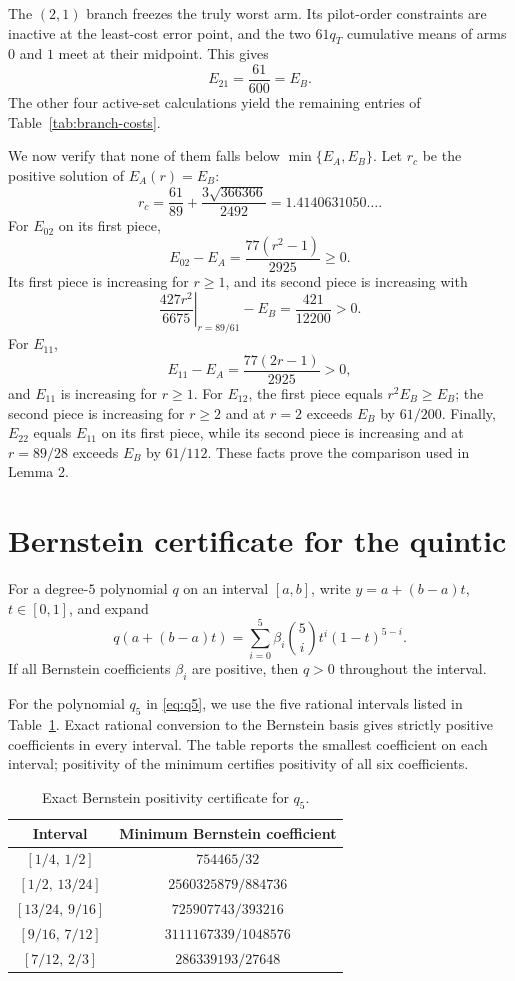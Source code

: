 \documentclass[11pt]{article}
\theoremstyle{definition}
\theoremstyle{remark}
\begin{document}
The $(2,1)$ branch freezes the truly worst arm. Its pilot-order constraints are inactive at the least-cost error point, and the two $61q_T$ cumulative means of arms $0$ and $1$ meet at their midpoint. This gives
\[
E_{21}=\frac{61}{600}=E_B.
\]
The other four active-set calculations yield the remaining entries of Table~\ref{tab:branch-costs}.

We now verify that none of them falls below $\min\{E_A,E_B\}$. Let $r_c$ be the positive solution of $E_A(r)=E_B$:
\[
r_c=\frac{61}{89}+\frac{3\sqrt{366366}}{2492}
=1.4140631050\ldots.
\]
For $E_{02}$ on its first piece,
\[
E_{02}-E_A=\frac{77(r^2-1)}{2925}\ge0.
\]
Its first piece is increasing for $r\ge1$, and its second piece is increasing with
\[
\left.\frac{427r^2}{6675}\right|_{r=89/61}-E_B=\frac{421}{12200}>0.
\]
For $E_{11}$,
\[
E_{11}-E_A=\frac{77(2r-1)}{2925}>0,
\]
and $E_{11}$ is increasing for $r\ge1$. For $E_{12}$, the first piece equals $r^2E_B\ge E_B$; the second piece is increasing for $r\ge2$ and at $r=2$ exceeds $E_B$ by $61/200$. Finally, $E_{22}$ equals $E_{11}$ on its first piece, while its second piece is increasing and at $r=89/28$ exceeds $E_B$ by $61/112$. These facts prove the comparison used in Lemma 2.

\section{Bernstein certificate for the quintic}
\label{app:bernstein}

For a degree-$5$ polynomial $q$ on an interval $[a,b]$, write $y=a+(b-a)t$, $t\in[0,1]$, and expand
\[
q(a+(b-a)t)=\sum_{i=0}^5 \beta_i\binom{5}{i}t^i(1-t)^{5-i}.
\]
If all Bernstein coefficients $\beta_i$ are positive, then $q>0$ throughout the interval.

For the polynomial $q_5$ in \eqref{eq:q5}, we use the five rational intervals listed in Table~\ref{tab:bernstein}. Exact rational conversion to the Bernstein basis gives strictly positive coefficients in every interval. The table reports the smallest coefficient on each interval; positivity of the minimum certifies positivity of all six coefficients.

\begin{table}[ht]
\centering
\small
\caption{Exact Bernstein positivity certificate for $q_5$.}
\label{tab:bernstein}
\begin{tabular}{c c}
\toprule
Interval & Minimum Bernstein coefficient \\
\midrule
$[1/4,\,1/2]$ & $754465/32$ \\
$[1/2,\,13/24]$ & $2560325879/884736$ \\
$[13/24,\,9/16]$ & $725907743/393216$ \\
$[9/16,\,7/12]$ & $3111167339/1048576$ \\
$[7/12,\,2/3]$ & $286339193/27648$ \\
\bottomrule
\end{tabular}
\end{table}
\end{document}
